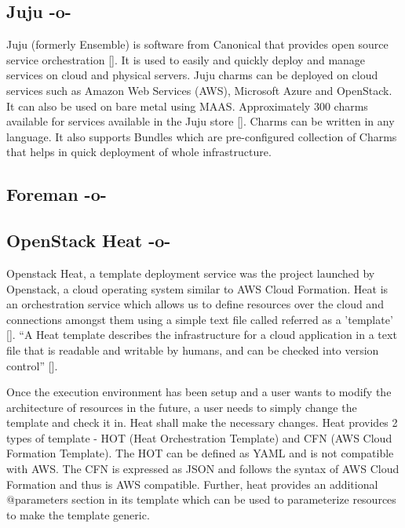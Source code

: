 \subsection{Juju -o-}

Juju (formerly Ensemble) is software from Canonical that provides open
source service orchestration [\cite{juju-paper}].  It is used to easily
and quickly deploy and manage services on cloud and physical
servers. Juju charms can be deployed on cloud services such as Amazon
Web Services (AWS), Microsoft Azure and OpenStack. It can also be used
on bare metal using MAAS.  Approximately 300 charms available for
services available in the Juju store [\cite{www-juju}]. Charms can be
written in any language. It also supports Bundles which are
pre-configured collection of Charms that helps in quick deployment of
whole infrastructure.



\subsection{Foreman -o-}



\subsection{OpenStack Heat -o-}

Openstack Heat, a template deployment service was the project launched
by Openstack, a cloud operating system similar to AWS Cloud
Formation. Heat is an orchestration service which allows us to define
resources over the cloud and connections amongst them using a simple
text file called referred as a
'template' [\cite{www-heat-blog-introduction}].  ``A Heat template
describes the infrastructure for a cloud application in a text file
that is readable and writable by humans, and can be checked into
version control'' [\cite{www-heat-wiki}].

Once the execution environment has been setup and a user wants to
modify the architecture of resources in the future, a user needs to
simply change the template and check it in. Heat shall make the
necessary changes. Heat provides 2 types of template - HOT (Heat
Orchestration Template) and CFN (AWS Cloud Formation Template). The
HOT can be defined as YAML and is not compatible with AWS. The CFN is
expressed as JSON and follows the syntax of AWS Cloud Formation and
thus is AWS compatible. Further, heat provides an additional
@parameters section in its template which can be used to parameterize
resources to make the template generic.



